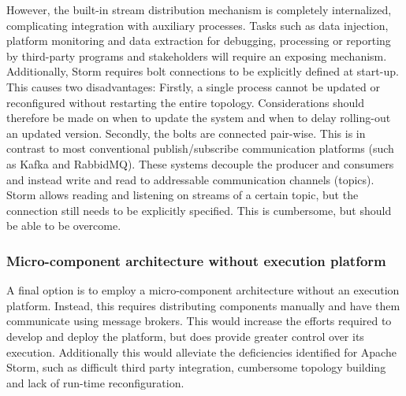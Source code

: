 However, the built-in stream distribution mechanism is completely internalized, complicating integration with auxiliary processes. Tasks such as data injection, platform monitoring and data extraction for debugging, processing or reporting by third-party programs and stakeholders will require an exposing mechanism. Additionally, Storm requires bolt connections to be explicitly defined at start-up. This causes two disadvantages: Firstly, a single process cannot be updated or reconfigured without restarting the entire topology. Considerations should therefore be made on when to update the system and when to delay rolling-out an updated version. Secondly, the bolts are connected pair-wise. This is in contrast to most conventional publish/subscribe communication platforms (such as Kafka and RabbidMQ). These systems decouple the producer and consumers and instead write and read to addressable communication channels (topics). Storm allows reading and listening on streams of a certain topic, but the connection still needs to be explicitly specified. This is cumbersome, but should be able to be overcome. 

\subsubsection*{Micro-component architecture without execution platform}
A final option is to employ a micro-component architecture without an execution platform. Instead, this requires distributing components manually and have them communicate using message brokers. This would increase the efforts required to develop and deploy the platform, but does provide greater control over its execution. Additionally this would alleviate the deficiencies identified for Apache Storm, such as difficult third party integration, cumbersome topology building and lack of run-time reconfiguration. 

